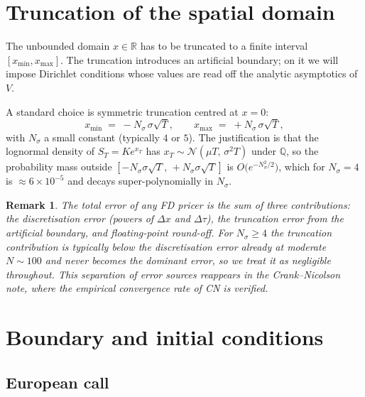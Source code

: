 \documentclass[11pt,a4paper]{article}
\newtheorem{remark}[proposition]{Remark}
\begin{document}
\section{Truncation of the spatial domain}

The unbounded domain $x \in \mathbb{R}$ has to be truncated to a finite
interval $[x_{\min}, x_{\max}]$. The truncation introduces an artificial
boundary; on it we will impose Dirichlet conditions whose values are
read off the analytic asymptotics of $V$.

A standard choice is symmetric truncation centred at $x = 0$:
\begin{equation}
x_{\min} \;=\; -N_\sigma\,\sigma\sqrt{T},
\qquad
x_{\max} \;=\; +N_\sigma\,\sigma\sqrt{T},
\label{eq:domain}
\end{equation}
with $N_\sigma$ a small constant (typically $4$ or $5$). The
justification is that the lognormal density of $S_T = K e^{x_T}$ has
$x_T \sim \mathcal{N}(\mu T,\, \sigma^2 T)$ under
$\mathbb{Q}$, so the probability mass outside
$[-N_\sigma \sigma\sqrt{T},\, +N_\sigma \sigma\sqrt{T}]$ is
$O\!\bigl(e^{-N_\sigma^2/2}\bigr)$, which for $N_\sigma = 4$ is
$\approx 6 \times 10^{-5}$ and decays super-polynomially in $N_\sigma$.

\begin{remark}
The total error of any FD pricer is the sum of three contributions:
the discretisation error (powers of $\Delta x$ and $\Delta\tau$), the
truncation error from the artificial boundary, and floating-point
round-off. For $N_\sigma \ge 4$ the truncation contribution is
typically below the discretisation error already at moderate
$N \sim 100$ and never becomes the dominant error, so we treat it as
negligible throughout. This separation of error sources reappears
in the Crank--Nicolson note, where the empirical convergence rate of CN
is verified.
\end{remark}

\section{Boundary and initial conditions}\label{sec:bcs}

\subsection*{European call}
\end{document}
